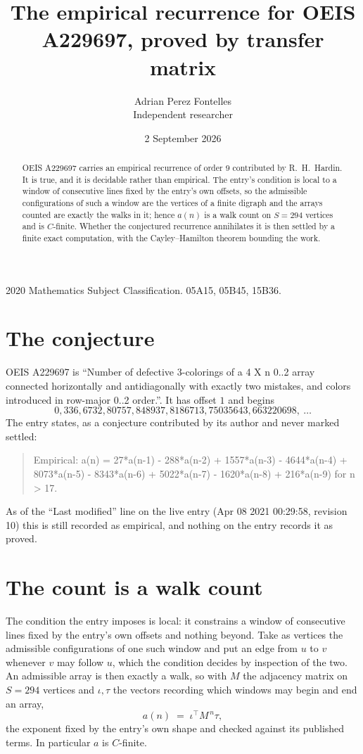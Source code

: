 \documentclass[11pt,a4paper]{article}
\title{The empirical recurrence for OEIS A229697, proved by transfer matrix}
\author{Adrian Perez Fontelles\\ \small Independent researcher}
\date{2 September 2026}
\theoremstyle{plain}
\theoremstyle{definition}
\begin{document}
\maketitle

\begin{abstract}
OEIS A229697 carries an empirical recurrence of order $9$ contributed by R.~H.~Hardin. It is
true, and it is decidable rather than empirical. The entry's condition is local to a window of consecutive lines fixed by the entry's own offsets, so
the admissible configurations of such a window are the vertices of a finite digraph and the
arrays counted are exactly the walks in it; hence $a(n)$ is a walk count on $S=294$ vertices
and is $C$-finite. Whether the conjectured recurrence annihilates it is then settled by a
finite exact computation, with the Cayley--Hamilton theorem bounding the work.
\end{abstract}

\noindent\small 2020 Mathematics Subject Classification. 05A15, 05B45, 15B36.\normalsize

\section{The conjecture}

OEIS A229697 is ``Number of defective 3-colorings of a 4 X n 0..2 array connected horizontally and antidiagonally with exactly two mistakes, and colors introduced in row-major 0..2 order.''. It has offset $1$ and begins
\[
0, 336, 6732, 80757, 848937, 8186713, 75035643, 663220698,\ \dots
\]
The entry states, as a conjecture contributed by its author and never marked settled:
\begin{quote}
Empirical: a(n) = 27*a(n-1) - 288*a(n-2) + 1557*a(n-3) - 4644*a(n-4) + 8073*a(n-5) - 8343*a(n-6) + 5022*a(n-7) - 1620*a(n-8) + 216*a(n-9) for n > 17.
\end{quote}
As of the ``Last modified'' line on the live entry (Apr 08 2021 00:29:58, revision 10) this is still
recorded as empirical, and nothing on the entry records it as proved.

\section{The count is a walk count}

The condition the entry imposes is local: it constrains a window of consecutive lines fixed by the entry's own offsets and nothing beyond. Take as
vertices the admissible configurations of one such window and put an edge from $u$ to $v$
whenever $v$ may follow $u$, which the condition decides by inspection of the two. An
admissible array is then exactly a walk, so with $M$ the adjacency matrix on $S=294$ vertices
and $\iota,\tau$ the vectors recording which windows may begin and end an array,
\[
a(n)\;=\;\iota^{\!\top}M^{\,n}\tau ,
\]
the exponent fixed by the entry's own shape and checked against its published terms. In
particular $a$ is $C$-finite.
\end{document}
